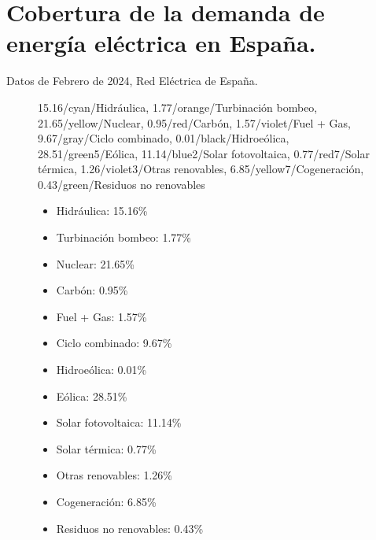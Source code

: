 \section{Cobertura de la demanda de energía eléctrica en España.}
	Datos de Febrero de 2024, Red Eléctrica de España.
	\begin{figure}[H]
		\centering
		\begin{minipage}{.6\textwidth}
			\donutchart
			{
				15.16/cyan/Hidráulica,
				1.77/orange/Turbinación bombeo,
				21.65/yellow/Nuclear,
				0.95/red/Carbón,
				1.57/violet/Fuel + Gas,
				9.67/gray/Ciclo combinado,
				0.01/black/Hidroeólica,
				28.51/green5/Eólica,
				11.14/blue2/Solar fotovoltaica,
				0.77/red7/Solar térmica,
				1.26/violet3/Otras renovables,
				6.85/yellow7/Cogeneración,
				0.43/green/Residuos no renovables
			}
		\end{minipage}%
		\begin{minipage}{.4\textwidth}
			\begin{itemize}
				\item[\textcolor{cyan}    {\rule{1em}{1em}}] Hidráulica: 15.16\%
				\item[\textcolor{orange}  {\rule{1em}{1em}}] Turbinación bombeo: 1.77\%
				\item[\textcolor{yellow}  {\rule{1em}{1em}}] Nuclear: 21.65\%
				\item[\textcolor{red}     {\rule{1em}{1em}}] Carbón: 0.95\%
				\item[\textcolor{violet}  {\rule{1em}{1em}}] Fuel + Gas: 1.57\%
				\item[\textcolor{gray}    {\rule{1em}{1em}}] Ciclo combinado: 9.67\%
				\item[\textcolor{black}   {\rule{1em}{1em}}] Hidroeólica: 0.01\%
				\item[\textcolor{green5}  {\rule{1em}{1em}}] Eólica: 28.51\%
				\item[\textcolor{blue2}   {\rule{1em}{1em}}] Solar fotovoltaica: 11.14\%
				\item[\textcolor{red7}    {\rule{1em}{1em}}] Solar térmica: 0.77\%
				\item[\textcolor{violet3} {\rule{1em}{1em}}] Otras renovables: 1.26\%
				\item[\textcolor{yellow7} {\rule{1em}{1em}}] Cogeneración: 6.85\%
				\item[\textcolor{green}   {\rule{1em}{1em}}] Residuos no renovables: 0.43\%
			\end{itemize}
		\end{minipage}
	\end{figure}